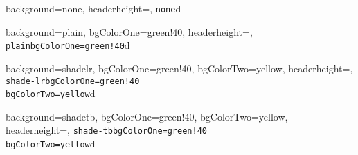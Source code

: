 \documentclass[portrait,fontscale=0.7,margin=0.2cm,paperwidth=8.2truecm, paperheight=11.88truecm,debug]{baposter}
\begin{document}
\begin{poster}{
  background=none,
  headerheight=\textheight,
}{}{\texttt{none}}{}{d}

\end{poster}

\begin{poster}{
  background=plain,
  bgColorOne=green!40,
  headerheight=\textheight,
}{}{\texttt{plain}}{\texttt{bgColorOne=green!40}}{d}

\end{poster}

\begin{poster}{
  background=shadelr,
  bgColorOne=green!40,
  bgColorTwo=yellow,
  headerheight=\textheight,
}{}{\texttt{shade-lr}}{\texttt{bgColorOne=green!40}\\
\texttt{bgColorTwo=yellow}}{d}

\end{poster}

\begin{poster}{
  background=shadetb,
  bgColorOne=green!40,
  bgColorTwo=yellow,
  headerheight=\textheight,
}{}{\texttt{shade-tb}}{\texttt{bgColorOne=green!40}\\
\texttt{bgColorTwo=yellow}}{d}
\end{poster}
\end{document}
